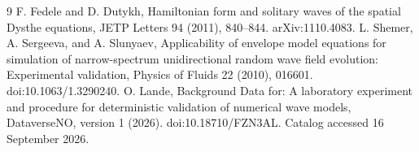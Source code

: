 \documentclass[10pt]{article}
\begin{document}
\begin{thebibliography}{9}
 F. Fedele and D. Dutykh, Hamiltonian form and solitary waves of the spatial Dysthe equations, JETP Letters 94 (2011), 840--844. arXiv:1110.4083.
 L. Shemer, A. Sergeeva, and A. Slunyaev, Applicability of envelope model equations for simulation of narrow-spectrum unidirectional random wave field evolution: Experimental validation, Physics of Fluids 22 (2010), 016601. doi:10.1063/1.3290240.
 O. Lande, Background Data for: A laboratory experiment and procedure for deterministic validation of numerical wave models, DataverseNO, version 1 (2026). doi:10.18710/FZN3AL. Catalog accessed 16 September 2026.
\end{thebibliography}
\end{document}
